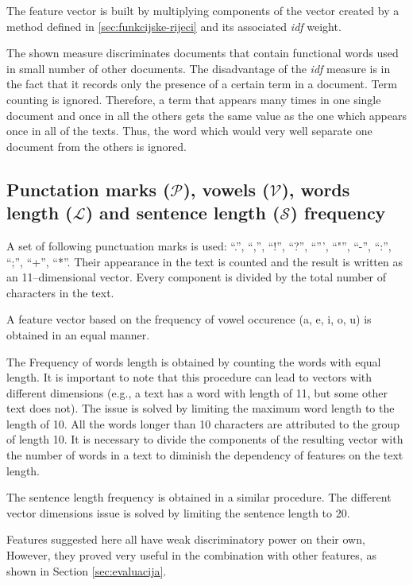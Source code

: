 \documentclass[11pt,english]{article}
\begin{document}
\begin{multicols}{2}
The feature vector is built by multiplying components of the vector created by a method
defined in \ref{sec:funkcijske-rijeci} and its associated \emph{idf} weight.

The shown measure discriminates documents that contain functional words used in small 
number of other documents. The disadvantage of the \emph{idf} measure is
in the fact that it records only the presence of a certain term in a document. Term
counting is ignored. Therefore, a term that appears many times in
one single document and once in all the others gets the same value as the one which appears
once in all of the texts. Thus, the word which would very well separate one document from the
others is ignored.

\subsection{Punctation marks ($\mathcal{P}$), vowels ($\mathcal{V}$), words
length ($\mathcal{L}$) and sentence length ($\mathcal{S}$) frequency}
\label{sec:znacajke-manje}
A set of following punctuation marks is used: ``.'', ``,'', ``!'', ``?'',
``''', ``"'', ``-'', ``:'', ``;'', ``+'', ``*''. Their appearance in the text is counted and
the result is written as an 11--dimensional vector. Every
component is divided by the total number of characters in the text. 

A feature vector based on the frequency of vowel occurence (a, e, i, o, u) is
obtained in an equal manner.

The Frequency of words length is obtained by counting the words with equal
length. It is important to note that this procedure can lead to vectors with different dimensions
(e.g., a text has a word with length of 11, but some other text does not). 
The issue is solved by limiting the maximum word length to the length of 10. 
All the words longer than 10 characters are attributed to the group of length 10. 
It is necessary to divide the components of the resulting vector 
with the number of words in a text to diminish the dependency of features on the text 
length. 

The sentence length frequency is obtained in a similar procedure.
The different vector dimensions issue is solved by limiting the sentence length to 20.

Features suggested here all have weak discriminatory power on their own, However, they proved 
very useful in the combination with other features, as shown in Section \ref{sec:evaluacija}.


\end{multicols}
\end{document}
